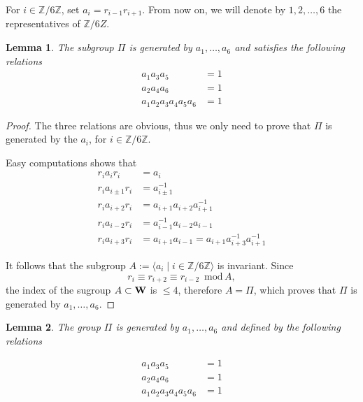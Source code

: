 \documentclass[12pt]{amsart}
\newcommand{\Z}{\mathbb{Z}}
\renewcommand{\mod}{\,\mathrm{mod}\,}
\newtheorem{lemma}{Lemma}
\begin{document}
For $i\in\Z/6\Z$, set $a_i=r_{i-1}r_{i+1}$. From now on, we will denote by
$1, 2,\ldots, 6$ the  representatives of $\Z/6Z$.




\begin{lemma}
 The subgroup $\Pi$ is generated by $a_1,\ldots, a_6$
 and satisfies the following relations
 \begin{align*}
 a_1 a_3 a_5&=1\\
 a_2 a_4 a_6&=1 \\
 a_1 a_2 a_3 a_4 a_5 a_6&=1 
 \end{align*}
\end{lemma}

\begin{proof}
The three relations are obvious, thus we only need to prove that
$\Pi$ is generated by the 
$a_i$, for $i\in\Z/6\Z$. 

Easy computations shows that 
\begin{align*}
r_ia_i r_i&=a_i\\
r_ia_{i\pm1}r_i&=a_{i\pm1}^{-1}\\
r_ia_{i+2}r_i&=a_{i+1}a_{i+2}a_{i+1}^{-1}\\
r_ia_{i-2}r_i&=a_{i-1}^{-1}a_{i-2}a_{i-1}\\
r_ia_{i+3}r_i&=a_{i+1}a_{i-1}=a_{i+1}a_{i+3}^{-1}a_{i+1}^{-1}
\end{align*}

It follows that the subgroup 
$A:=\langle a_i\mid i\in\Z/6\Z\rangle$ is invariant.
Since 
$$r_i\equiv r_{i+2}\equiv r_{i-2}\,\,\mod A,$$ 
the index of the sugroup $A\subset{\bf W}$ is $\leq 4$, therefore
$A=\Pi$, which proves that
$\Pi$ is generated by $a_1,\ldots, a_6$.
\end{proof}

\begin{lemma}\label{relations} The group $\Pi$ is generated by $a_1,\ldots, a_6$
and defined by the following relations

 \begin{align}
 a_1 a_3 a_5&=1 \label{free1}\\
 a_2 a_4 a_6&=1 \label{free2}\\
 a_1 a_2 a_3 a_4 a_5 a_6&=1 \label{relation}
 \end{align}
\end{lemma}
\end{document}
